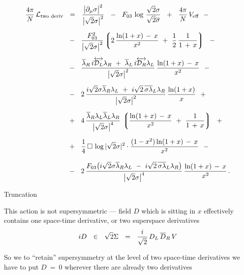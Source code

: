 \documentclass{beamer}
\begin{document}
\begin{frame}{}
\vskip -4mm
{\footnotesize
\begin{align*}
%
	\frac{4\pi}{N}\, \cell_\text{two deriv} &    ~~=~~  
	\frac{ \big|\p_\mu \sigma\big|^2 }
	{ \big|\sqrt{2}\sigma\big|^2 }
	~~-~~
	F_{03}\, \log\, \frac{\sqrt{2}\sigma}{\sqrt{2}\ov\sigma}
	~~+~~
	\frac{4\pi}{N}\, V_\text{eff}
	~~-
	\\[2mm]
%
	&
	~~-~~
	\frac{F_{03}^2}{\big|\sqrt{2}\sigma\big|^2}
	\lgr 2\, \frac{ \ln (1 + x) \,-\, x } { x^2 }  ~+~
		\frac{1}{2}\, \frac{1}{1 \,+\, x} \rgr
	~~-
	\\[2mm]
%
	&
	~~-~~
	\frac{
		\ov\lambda{}_R\, i\overleftrightarrow{\md_L} \lambda_R  ~+~ 
		\ov\lambda{}_L\, i\overleftrightarrow{\md_R} \lambda_L
	} { \big|\sqrt{2}\sigma\big|^2 }
	\,
	\frac{ \ln (1 + x) \,-\, x } { x^2 }
	~~-
	\\[2mm]
%
	&
	~~-~~ 
	2\,\frac{
		i\sqrt{2}\sigma\ov\lambda{}_R\lambda_L  ~+~  
		i\sqrt{2}\,\ov{\sigma\lambda}{}_L\lambda_R
	} { \big|\sqrt{2}\sigma\big|^2 }\,
	\frac{ \ln (1 + x) } { x }
	~~+
	\\[2mm]
%
	&
	~~+~~
	4\,\frac{
		\ov\lambda{}_R \lambda_L \ov\lambda{}_L \lambda_R
	} { \big|\sqrt{2}\sigma\big|^4 }\,
	\lgr \frac{ \ln (1 + x) \,-\, x } { x^2 }  ~+~
		\frac{1}{1 \,+\, x} \rgr
	~~+
	\\[2mm]
%
	&
	~~+~~
	\frac{1}{4}\,\Box\,\log |\sqrt{2}\sigma|^2 \cdot
	\frac{ (1 - x^2) \ln (1 + x) \,-\, x } { x^2 }
	~~-
	\\[3mm]
%
	&
	~~-~~
	2\,\frac{ F_{03} \big( i\sqrt{2}\sigma\ov\lambda{}_R\lambda_L ~-~
			       i\sqrt{2}\,\ov{\sigma\lambda}{}_L\lambda_R \big) }
		{ \big|\sqrt{2}\sigma\big|^4 }\,
	\frac{ \ln (1 + x) \,-\, x } { x^2 }\,.
\end{align*}
}
\end{frame}


\begin{frame}{Truncation}

	This action is not supersymmetric --- field $ D $ which is sitting in $ x $
	effectively contains one space-time derivative, or two superspace derivatives
\[
	iD  ~~\in~~  \sqrt{2}\Sigma ~~=~~  \frac{i}{\sqrt 2}\, D_L\, \overline D{}_R\, V
\]

	So we to ``retain'' supersymmetry at the level of two space-time derivatives
	we have to put $ D ~=~ 0 $ wherever there are already two derivatives

\end{frame}
\end{document}

